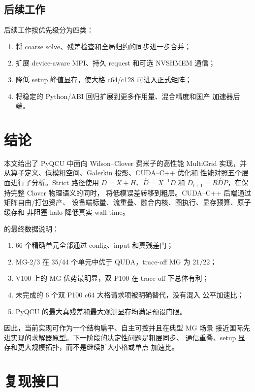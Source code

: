 \documentclass[UTF8,a4paper,11pt,fontset=none]{ctexart}
\numberwithin{equation}{section}
\numberwithin{figure}{section}
\numberwithin{table}{section}
\newcommand{\code}[1]{\texttt{\detokenize{#1}}}
\begin{document}
\subsection{后续工作}

后续工作按优先级分为四类：
\begin{enumerate}
  \item 将 coarse solve、残差检查和全局归约的同步进一步合并；
  \item 扩展 device-aware MPI、持久 request 和可选 NVSHMEM 通信；
  \item 降低 setup 峰值显存，使大格 c64/c128 可进入正式矩阵；
  \item 将稳定的 Python/ABI 回归扩展到更多作用量、混合精度和国产
        加速器后端。
\end{enumerate}

\section{结论}

本文给出了 PyQCU 中面向 Wilson--Clover 费米子的高性能 MultiGrid
实现，并从算子定义、低模粗空间、Galerkin 投影、CUDA--C++ 优化和
性能对照五个层面进行了分析。Strict 路径使用
\(D=X+H\)、\(\widehat D=X^{-1}D\) 和
\(D_{l+1}=R\widehat DP\)，在保持完整 Clover 物理语义的同时，
将低模误差转移到粗层。CUDA--C++ 后端通过矩阵自由/打包资产、
设备端标量、流重叠、融合内核、图执行、显存预算、原子缓存和
非阻塞 halo 降低真实 wall time。

\code{test27} 的最终数据说明：
\begin{enumerate}
  \item 66 个精确单元全部通过 config、input 和真残差门；
  \item MG-2/3 在 35/44 个单元中优于 QUDA，trace-off MG 为
        21/22；
  \item V100 上的 MG 优势最明显，双 P100 在 trace-off 下总体有利；
  \item 未完成的 6 个双 P100 c64 大格请求项被明确替代，没有混入
        公平加速比；
  \item PyQCU 的最大真残差和最大观测显存均满足预设门限。
\end{enumerate}
因此，当前实现可作为一个结构扁平、自主可控并且在典型 MG 场景
接近国际先进实现的求解器原型。下一阶段的决定性问题是粗层同步、
通信重叠、setup 显存和更大规模拓扑，而不是继续扩大小格或单点
加速比。

\appendix

\section{复现接口}
\end{document}
